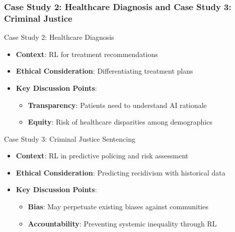 \documentclass[aspectratio=169]{beamer}
\begin{document}
\begin{frame}[fragile]
    \frametitle{Case Study 2: Healthcare Diagnosis and Case Study 3: Criminal Justice}
    \begin{block}{Case Study 2: Healthcare Diagnosis}
        \begin{itemize}
            \item \textbf{Context}: RL for treatment recommendations
            \item \textbf{Ethical Consideration}: Differentiating treatment plans
            \item \textbf{Key Discussion Points}:
            \begin{itemize}
                \item \textbf{Transparency}: Patients need to understand AI rationale
                \item \textbf{Equity}: Risk of healthcare disparities among demographics
            \end{itemize}
        \end{itemize}
    \end{block}

    \vspace{0.5cm}
    
    \begin{block}{Case Study 3: Criminal Justice Sentencing}
        \begin{itemize}
            \item \textbf{Context}: RL in predictive policing and risk assessment
            \item \textbf{Ethical Consideration}: Predicting recidivism with historical data
            \item \textbf{Key Discussion Points}:
            \begin{itemize}
                \item \textbf{Bias}: May perpetuate existing biases against communities
                \item \textbf{Accountability}: Preventing systemic inequality through RL
            \end{itemize}
        \end{itemize}
    \end{block}
\end{frame}
\end{document}
